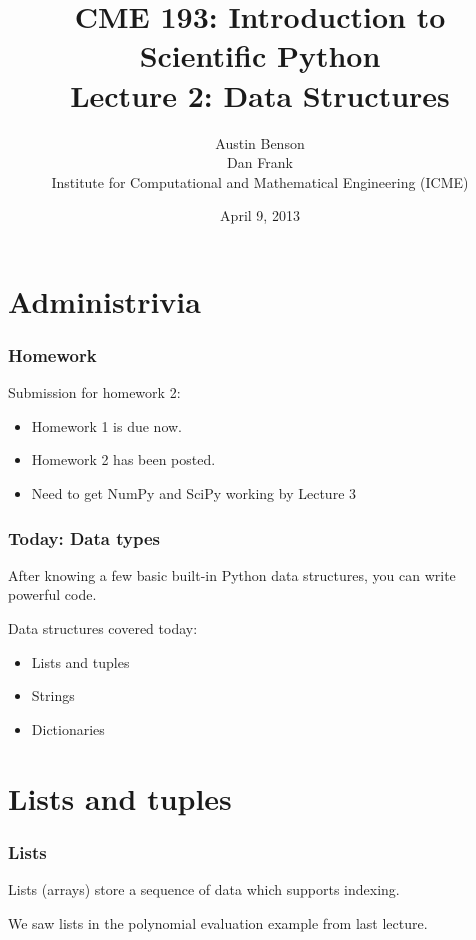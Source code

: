 \documentclass{beamer}
\title{CME 193: Introduction to Scientific Python \\
Lecture 2: Data Structures}
\author{Austin Benson \\
\vspace{0.1in}
Dan Frank \\
\vspace{0.1in}
Institute for Computational and Mathematical Engineering (ICME)}
\date{April 9, 2013}
\begin{document}
\maketitle

\section{Administrivia}
\begin{frame}
\frametitle{Homework}


\vspace{0.2in}
Submission for homework 2:
\begin{itemize}
\setlength{\itemsep}{0.1in}
\item{Homework 1 is due now.}
\item{Homework 2 has been posted.}
\item{Need to get NumPy and SciPy working by Lecture 3}
\end{itemize}
\end{frame}


\begin{frame}
\frametitle{Today: Data types}

After knowing a few basic built-in Python data structures, you can write powerful code.

\vspace{0.1in}

Data structures covered today:
\begin{itemize}
\setlength{\itemsep}{0.1in}
\item{Lists and tuples}
\item{Strings}
\item{Dictionaries}
\end{itemize}

\end{frame}

\section{Lists and tuples}

\begin{frame}
\frametitle{Lists}

Lists (arrays) store a sequence of data which supports indexing.

\vspace{0.1in}

We saw lists in the polynomial evaluation example from last lecture.

\end{frame}
\end{document}
